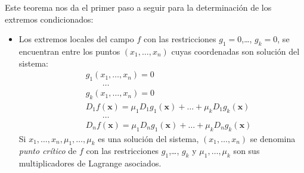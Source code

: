 \newpage
Este teorema nos da el primer paso a seguir para la
determinación de los extremos condicionados:
\begin{itemize}
\item
Los extremos locales del campo $f$ con las restricciones 
$g_1=0$,\dots, $g_k=0$, se encuentran entre los puntos $(x_1,\dots ,x_n)$ cuyas
coordenadas son solución del sistema:
\begin{eqnarray*}
&&g_1(x_1,\dots ,x_n)=0\\
&&\qquad \dots\\
&&g_k(x_1,\dots ,x_n)=0\\
&&D_1f(\boldsymbol{x}) = 
\mu_1 D_1g_1(\boldsymbol{x})+\dots +\mu_k D_1g_k(\boldsymbol{x})\\
&&\qquad \dots\\
&&D_nf(\boldsymbol{x}) = 
\mu_1 D_ng_1(\boldsymbol{x})+\dots +\mu_k D_ng_k(\boldsymbol{x})
\end{eqnarray*}
Si $x_1,\dots,x_n,\mu_1,\dots,\mu_k$ es una solución del
sistema, $(x_1,\dots,x_n)$ se denomina \emph{punto crítico} de $f$ con las
restricciones $g_1$,\dots, $g_k$ y
$\mu_1,\dots,\mu_k$ son sus multiplicadores de Lagrange asociados.
\end{itemize}

